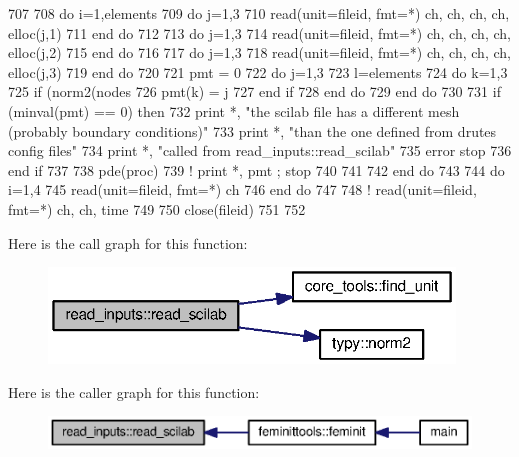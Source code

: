 \begin{DoxyCode}
707       
708       \textcolor{keywordflow}{do} i=1,elements%
709         \textcolor{keywordflow}{do} j=1,3
710           \textcolor{keyword}{read}(unit=fileid, fmt=*) ch, ch, ch, ch, elloc(j,1)
711 \textcolor{keywordflow}{        end do}
712         
713         \textcolor{keywordflow}{do} j=1,3
714           \textcolor{keyword}{read}(unit=fileid, fmt=*) ch, ch, ch, ch, elloc(j,2)
715 \textcolor{keywordflow}{        end do}
716         
717         \textcolor{keywordflow}{do} j=1,3
718           \textcolor{keyword}{read}(unit=fileid, fmt=*) ch, ch, ch, ch, elloc(j,3)
719 \textcolor{keywordflow}{        end do}
720         
721         pmt = 0
722         \textcolor{keywordflow}{do} j=1,3
723           l=elements%
724           \textcolor{keywordflow}{do} k=1,3
725             \textcolor{keywordflow}{if} (norm2(nodes%
726               pmt(k) = j
727 \textcolor{keywordflow}{            end if}
728 \textcolor{keywordflow}{          end do}
729 \textcolor{keywordflow}{        end do}
730         
731         \textcolor{keywordflow}{if} (minval(pmt) == 0) \textcolor{keywordflow}{then}
732           print *, \textcolor{stringliteral}{"the scilab file has a different mesh (probably boundary conditions)"}
733           print *, \textcolor{stringliteral}{"than the one defined from drutes config files"}
734           print *, \textcolor{stringliteral}{"called from read\_inputs::read\_scilab"}
735           error stop
736 \textcolor{keywordflow}{        end if}
737           
738         pde(proc)%
739 \textcolor{comment}{!         print *, pmt ; stop}
740           
741 
742 \textcolor{keywordflow}{      end do}
743       
744       \textcolor{keywordflow}{do} i=1,4
745         \textcolor{keyword}{read}(unit=fileid, fmt=*) ch
746 \textcolor{keywordflow}{      end do}
747       
748 \textcolor{comment}{!       read(unit=fileid, fmt=*) ch, ch, time}
749 
750       \textcolor{keyword}{close}(fileid)    
751       
752     
\end{DoxyCode}


Here is the call graph for this function\+:\nopagebreak
\begin{figure}[H]
\begin{center}
\leavevmode
\includegraphics[width=306pt]{namespaceread__inputs_a954a7e348edc1cfa2fd131955cf224a5_cgraph}
\end{center}
\end{figure}




Here is the caller graph for this function\+:\nopagebreak
\begin{figure}[H]
\begin{center}
\leavevmode
\includegraphics[width=350pt]{namespaceread__inputs_a954a7e348edc1cfa2fd131955cf224a5_icgraph}
\end{center}
\end{figure}


